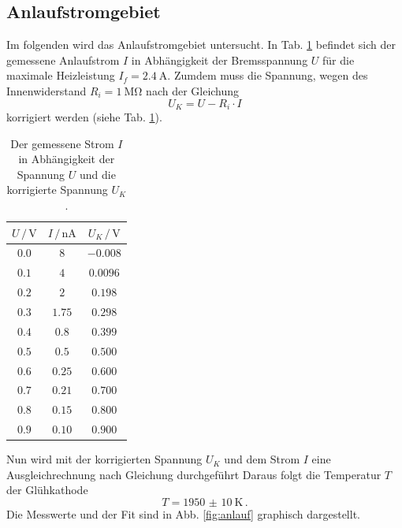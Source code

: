 \subsection{Anlaufstromgebiet}
Im folgenden wird das Anlaufstromgebiet untersucht.
In Tab. \ref{tab:anlauf} befindet sich der gemessene Anlaufstrom $I$ in Abhängigkeit der Bremsspannung $U$ für die maximale Heizleistung $I_f = \SI{2.4}{\ampere}$.
Zumdem muss die Spannung, wegen des Innenwiderstand $R_i = \SI{1}{\mega\ohm}$ nach der Gleichung
\begin{equation}
    U_K = U - R_i \cdot I
\end{equation}
korrigiert werden (siehe Tab. \ref{tab:anlauf}).
\begin{table}
    \centering
    \begin{tabular}{ccc}
        \toprule
        $U \,/\, \si{\volt}$ & $I \,/\, \si{\nano\ampere}$ & $U_K \,/\, \si{\volt}$ \\
        \midrule
        $0.0$ & $8$ & $-0.008$ \\
        $0.1$ & $4$ & $0.0096$ \\
        $0.2$ & $2$ & $0.198$ \\
        $0.3$ & $1.75$ & $0.298$ \\
        $0.4$ & $0.8$ & $0.399$ \\
        $0.5$ & $0.5$ & $0.500$ \\
        $0.6$ & $0.25$ & $0.600$ \\
        $0.7$ & $0.21$ & $0.700$ \\
        $0.8$ & $0.15$ & $0.800$ \\
        $0.9$ & $0.10$ & $0.900$ \\
        \bottomrule
    \end{tabular}
    \caption{Der gemessene Strom $I$ in Abhängigkeit der Spannung $U$ und die korrigierte Spannung $U_K$.}
    \label{tab:anlauf}
\end{table}
Nun wird mit der korrigierten Spannung $U_K$ und dem Strom $I$ eine Ausgleichrechnung \cite{scipy} nach Gleichung durchgeführt %
Daraus folgt die Temperatur $T$ der Glühkathode
\begin{equation*}
    T = \SI{1950(10)}{\kelvin} \, .
\end{equation*}
Die Messwerte und der Fit sind in Abb. \ref{fig:anlauf} graphisch dargestellt.
